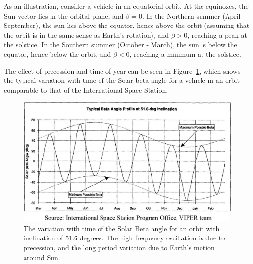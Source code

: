 As an illustration, consider a vehicle in an equatorial orbit.  At the equinoxes, the Sun-vector lies in the orbital plane, and $\beta = 0$.  In the Northern summer (April - September), the sun lies above the equator, hence above the orbit (assuming that the orbit is in the same sense as Earth's rotation), and $\beta > 0$, reaching a peak at the solstice.  In the Southern summer (October - March), the sun is below the equator, hence below the orbit, and $\beta < 0$, reaching a minimum at the solstice.

The effect of precession and time of year can be seen in Figure~\ref{fig:solarbetaISS}, which shows the typical variation with time of the Solar beta angle for a vehicle in an orbit comparable to that of the International Space Station.

\begin{figure}[htp]
\begin{center}
\includegraphics[width=5in]{figures/solar_beta_iss.jpg}
\caption{The variation with time of the Solar Beta angle for an orbit with inclination of 51.6 degrees.  The high frequency oscillation is due to precession, and the long period variation due to Earth's motion around Sun.}
\label{fig:solarbetaISS}
\end{center}
\end{figure}

